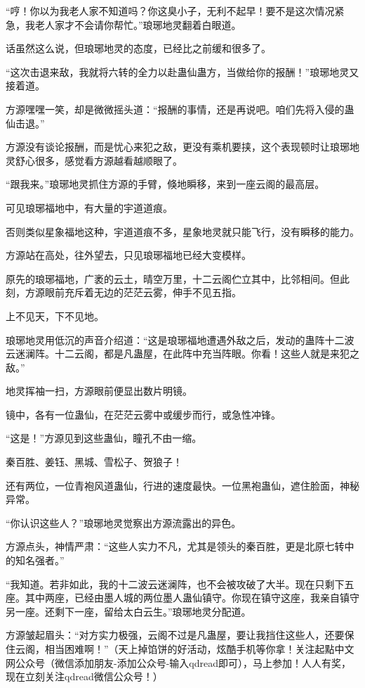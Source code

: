 \begin{this_body}
“哼！你以为我老人家不知道吗？你这臭小子，无利不起早！要不是这次情况紧急，我老人家才不会请你帮忙。”琅琊地灵翻着白眼道。

话虽然这么说，但琅琊地灵的态度，已经比之前缓和很多了。

“这次击退来敌，我就将六转的全力以赴蛊仙蛊方，当做给你的报酬！”琅琊地灵又接着道。

方源嘿嘿一笑，却是微微摇头道：“报酬的事情，还是再说吧。咱们先将入侵的蛊仙击退。”

方源没有谈论报酬，而是忧心来犯之敌，更没有乘机要挟，这个表现顿时让琅琊地灵舒心很多，感觉看方源越看越顺眼了。

“跟我来。”琅琊地灵抓住方源的手臂，倏地瞬移，来到一座云阁的最高层。

可见琅琊福地中，有大量的宇道道痕。

否则类似星象福地这种，宇道道痕不多，星象地灵就只能飞行，没有瞬移的能力。

方源站在高处，往外望去，只见琅琊福地已经大变模样。

原先的琅琊福地，广袤的云土，晴空万里，十二云阁伫立其中，比邻相间。但此刻，方源眼前充斥着无边的茫茫云雾，伸手不见五指。

上不见天，下不见地。

琅琊地灵用低沉的声音介绍道：“这是琅琊福地遭遇外敌之后，发动的蛊阵十二波云迷澜阵。十二云阁，都是凡蛊屋，在此阵中充当阵眼。你看！这些人就是来犯之敌。”

地灵挥袖一扫，方源眼前便显出数片明镜。

镜中，各有一位蛊仙，在茫茫云雾中或缓步而行，或急性冲锋。

“这是！”方源见到这些蛊仙，瞳孔不由一缩。

秦百胜、姜钰、黑城、雪松子、贺狼子！

还有两位，一位青袍风道蛊仙，行进的速度最快。一位黑袍蛊仙，遮住脸面，神秘异常。

“你认识这些人？”琅琊地灵觉察出方源流露出的异色。

方源点头，神情严肃：“这些人实力不凡，尤其是领头的秦百胜，更是北原七转中的知名强者。”

“我知道。若非如此，我的十二波云迷澜阵，也不会被攻破了大半。现在只剩下五座。其中两座，已经由墨人城的两位墨人蛊仙镇守。你现在镇守这座，我亲自镇守另一座。还剩下一座，留给太白云生。”琅琊地灵分配道。

方源皱起眉头：“对方实力极强，云阁不过是凡蛊屋，要让我挡住这些人，还要保住云阁，相当困难啊！”（天上掉馅饼的好活动，炫酷手机等你拿！关注起點中文网公众号（微信添加朋友-添加公众号-输入qdread即可），马上参加！人人有奖，现在立刻关注qdread微信公众号！）

\end{this_body}

